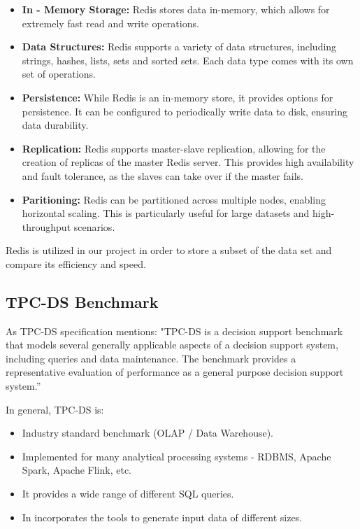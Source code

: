\documentclass[conference]{IEEEtran}
\begin{document}
\begin{itemize}
    \item \textbf{In - Memory Storage:} Redis stores data in-memory, which allows for extremely fast read and write operations.
    \item \textbf{Data Structures:} Redis supports a variety of data structures, including strings, hashes, lists, sets and sorted sets. Each data type comes with its own set of operations.
    \item \textbf{Persistence:} While Redis is an in-memory store, it provides options for persistence. It can be configured to periodically write data to disk, ensuring data durability.
    \item \textbf{Replication:} Redis supports master-slave replication, allowing for the creation of replicas of the master Redis server.
          This provides high availability and fault tolerance, as the slaves can take over if the master fails.
    \item \textbf{Paritioning:} Redis can be partitioned across multiple nodes, enabling horizontal scaling. This is particularly useful for large datasets and high-throughput scenarios.
\end{itemize}

Redis is utilized in our project in order to store a subset of the data set and compare its efficiency and speed.

\subsection{TPC-DS Benchmark}
\label{sec:tpc-ds-benchmark}

As TPC-DS specification \cite{b1} mentions: "TPC-DS is a decision support benchmark that models several generally applicable
aspects of a decision support system, including queries and data maintenance. The benchmark provides a representative evaluation
of performance as a general purpose decision support system.”

In general, TPC-DS is:

\begin{itemize}
    \item Industry standard benchmark (OLAP / Data Warehouse).
    \item Implemented for many analytical processing systems - RDBMS, Apache Spark, Apache Flink, etc.
    \item It provides a wide range of different SQL queries.
    \item In incorporates the tools to generate input data of different sizes.
\end{itemize}
\end{document}

